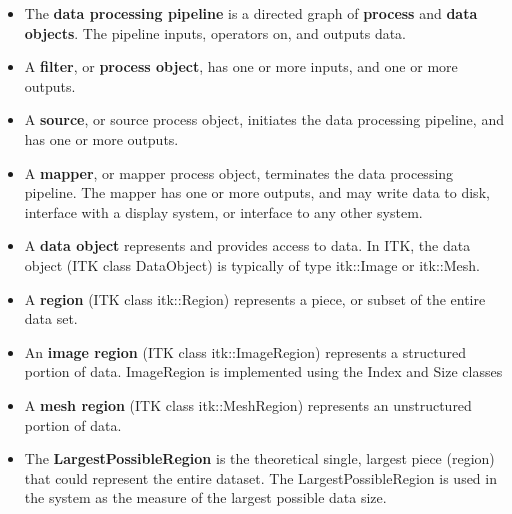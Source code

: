 \begin{itemize}
        \item The \textbf{data processing pipeline} is a directed graph of
        \textbf{process} and \textbf{data objects}. The pipeline inputs,
        operators on, and outputs data.

        \item A \textbf{filter}, or \textbf{process object}, has one or more
        inputs, and one or more outputs.

        \item A \textbf{source}, or source process object, initiates the data
        processing pipeline, and has one or more outputs.

        \item A \textbf{mapper}, or mapper process object, terminates the
        data processing pipeline. The mapper has one or more outputs, and may
        write data to disk, interface with a display system, or interface to
        any other system.

        \item A \textbf{data object} represents and provides access to
        data. In ITK, the data object (ITK class DataObject) is typically of
        type itk::Image or itk::Mesh.

        \item A \textbf{region} (ITK class itk::Region) represents a piece,
        or subset of the entire data set.

        \item An \textbf{image region} (ITK class itk::ImageRegion)
        represents a structured portion of data. ImageRegion is implemented
        using the Index and Size classes

        \item A \textbf{mesh region} (ITK class itk::MeshRegion) represents
        an unstructured portion of data.

        \item The \textbf{LargestPossibleRegion} is the theoretical single,
        largest piece (region) that could represent the entire dataset. The
        LargestPossibleRegion is used in the system as the measure of the
        largest possible data size.


\end{itemize}
